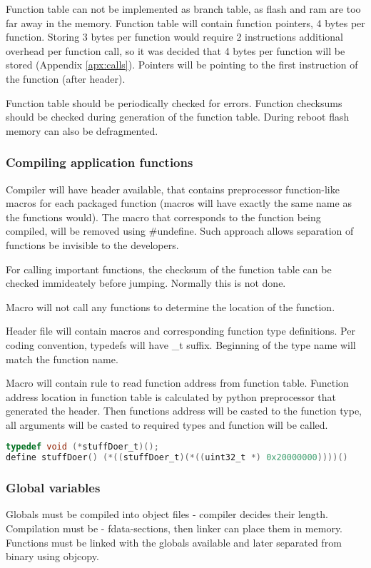 Function table can not be implemented as branch table, as flash and ram are too far away in the memory. Function table will contain function pointers, 4 bytes per function. Storing 3 bytes per function would require 2 instructions additional overhead per function call, so it was decided that 4 bytes per function will be stored (Appendix \ref{apx:calls}). Pointers will be pointing to the first instruction of the function (after header).

Function table should be periodically checked for errors. Function checksums should be checked during generation of the function table. During reboot flash memory can also be defragmented.

\subsubsection{Compiling application functions}

Compiler will have header available, that contains preprocessor function-like macros for each packaged function (macros will have exactly the same name as the functions would). The macro that corresponds to the function being compiled, will be removed using #undefine. Such approach allows separation of functions be invisible to the developers.

For calling important functions, the checksum of the function table can be checked immideately before jumping. Normally this is not done.

Macro will not call any functions to determine the location of the function.

Header file will contain macros and corresponding function type definitions. Per coding convention, typedefs will have \_t suffix. Beginning of the type name will match the function name.

Macro will contain rule to read function address from function table. Function address location in function table is calculated by python preprocessor that generated the header. Then functions address will be casted to the function type, all arguments will be casted to required types and function will be called.

\begin{lstlisting}[language=C]
typedef void (*stuffDoer_t)();
define stuffDoer() (*((stuffDoer_t)(*((uint32_t *) 0x20000000))))()
\end{lstlisting}

\subsubsection{Global variables}

Globals must be compiled into object files - compiler decides their length. Compilation must be  - fdata-sections, then linker can place them in memory. Functions must be linked with the globals available and later separated from binary using objcopy.
